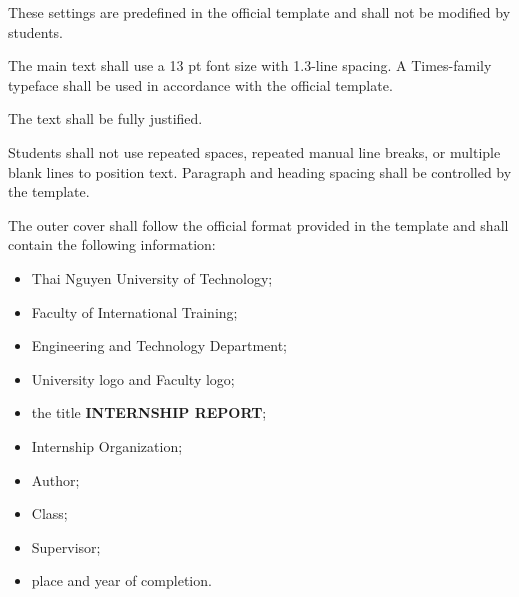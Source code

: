{These settings are predefined in the official template and shall not be
modified by students.

\vspace{0.3cm}


\noindent
{}

\vspace{0.15cm}

The main text shall use a 13 pt font size with 1.3-line spacing.
A Times-family typeface shall be used in accordance with the official
template.

The text shall be fully justified.

Students shall not use repeated spaces, repeated manual line breaks, or
multiple blank lines to position text. Paragraph and heading spacing shall
be controlled by the template.

\vspace{0.3cm}


\noindent
{}

\vspace{0.15cm}

The outer cover shall follow the official format provided in the template
and shall contain the following information:

\begin{itemize}[leftmargin=0.8cm, itemsep=2pt]
    \item Thai Nguyen University of Technology;
    \item Faculty of International Training;
    \item Engineering and Technology Department;
    \item University logo and Faculty logo;
    \item the title \textbf{INTERNSHIP REPORT};
    \item Internship Organization;
    \item Author;
    \item Class;
    \item Supervisor;
    \item place and year of completion.
\end{itemize}

}
